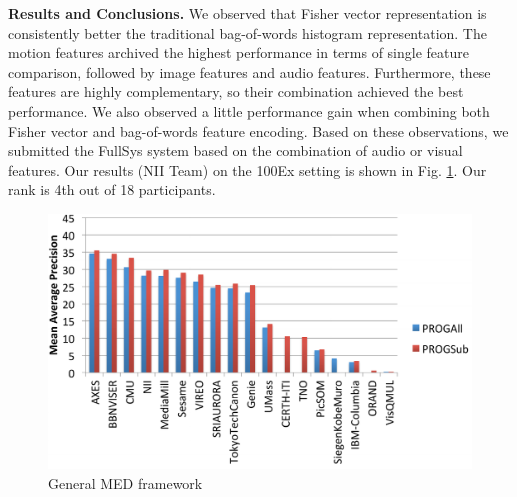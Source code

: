 \textbf{Results and Conclusions.} We observed that Fisher vector representation is consistently better the traditional bag-of-words histogram representation. The motion features archived the highest performance in terms of single feature comparison, followed by image features and audio features. Furthermore, these features are highly complementary, so their combination achieved the best performance. We also observed a little performance gain when combining both Fisher vector and bag-of-words feature encoding. Based on these observations, we submitted the FullSys system based on the combination of audio or visual features. Our results (NII Team) on the 100Ex setting is shown in Fig. \ref{med2013_result}. Our rank is 4th out of 18 participants.

\begin{figure}
	\centering
	\includegraphics[width=\textwidth]{results.pdf}
	\caption{General MED framework}
	\label{med2013_result}
\end{figure} 